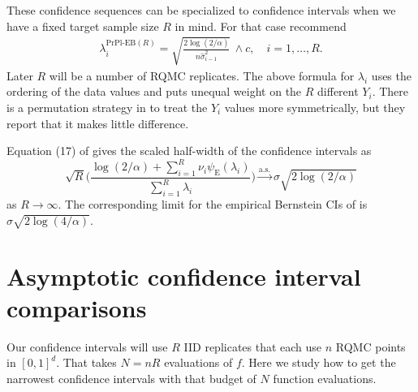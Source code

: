 \documentclass{article}
\newcommand{\art}[1]{\begingroup\color{blue}#1\endgroup}
\newcommand{\e}{\mathbb{E}}
\newcommand{\toas}{\stackrel{\mathrm{a.s.}}{\to}}
\newcommand{\giv}{\!\mid\!} %
\newcommand{\prpleb}{\text{PrPl-EB}}
\newcommand{\eb}{\mathrm{E}}
\begin{document}
These confidence sequences can be specialized to confidence
intervals when we have a fixed target sample size $R$
in mind.  For that case \cite{WauRam24a}
recommend
\begin{align}\label{eq:purplelambda}
\lambda_i^{\prpleb(R)} = \sqrt{\frac{2\log(2/\alpha)}{n\hat\sigma^2_{i-1}}}\,\wedge c,\quad i=1,\dots,R.
\end{align}
Later $R$ will be a number of RQMC replicates.
The above formula for $\lambda_i$ uses the ordering
of the data values and puts unequal weight on the
$R$ different $Y_i$. There is a permutation strategy
in \cite{WauRam24a} to treat the $Y_i$ values more
symmetrically, but they report that it makes little difference.

Equation (17) of \cite{WauRam24a} gives the
scaled half-width of the \prpleb{} confidence intervals as
$$
\sqrt{R}\biggl(\frac{\log(2/\alpha)+\sum_{i=1}^R\nu_i\psi_\eb(\lambda_i)}{\sum_{i=1}^R\lambda_i} \biggr)\toas \sigma\sqrt{2\log(2/\alpha)}
$$
as $R\to\infty$.  The corresponding limit for the empirical
Bernstein CIs of \cite{maurer2009empirical}
is $\sigma\sqrt{2\log(4/\alpha)}$.


\section{Asymptotic confidence interval comparisons}\label{sec:asymptotic}

Our confidence intervals will use $R$ IID replicates that each
use $n$ RQMC points in $[0,1]^d$.  That takes $N=nR$
evaluations of $f$. 
Here we study how to get the narrowest confidence
intervals with that budget of $N$ function evaluations.
\end{document}

